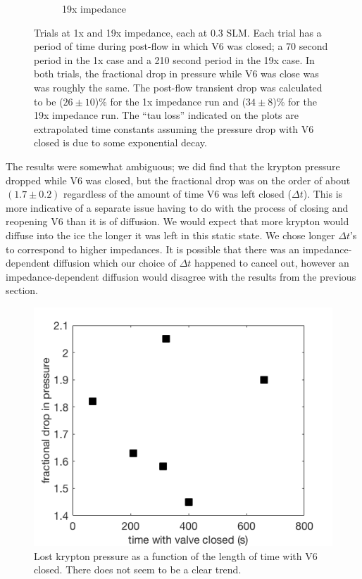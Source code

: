 \documentclass[12pt]{article}
\begin{document}
\begin{figure}[h!]
\begin{subfigure}{0.5\textwidth}
  \caption{19x impedance}
  \label{fig:cyrano15x}
\end{subfigure}
\caption{Trials at 1x and 19x impedance, each at 0.3 SLM. Each trial has a period of time during post-flow in which V6 was closed; a 70 second period in the 1x case and a 210 second period in the 19x case. In both trials, the fractional drop in pressure while V6 was close was was roughly the same. The post-flow transient drop was calculated to be ($26\pm10$)\% for the 1x impedance run and ($34\pm8$)\% for the 19x impedance run. The ``tau loss'' indicated on the plots are extrapolated time constants assuming the pressure drop with V6 closed is due to some exponential decay.} 
\label{fig:cyrano_trace}
\end{figure}

The results were somewhat ambiguous; we did find that the krypton pressure dropped while V6 was closed, but the fractional drop was on the order of about $(1.7\pm0.2)$ regardless of the amount of time V6 was left closed ($\Delta t$). This is more indicative of a separate issue having to do with the process of closing and reopening V6 than it is of diffusion. We would expect that more krypton would diffuse into the ice the longer it was left in this static state. We chose longer $\Delta t$'s to correspond to higher impedances. It is possible that there was an impedance-dependent diffusion which our choice of $\Delta t$ happened to cancel out, however an impedance-dependent diffusion would disagree with the results from the previous section.
\begin{figure}[h!]
\centering
\includegraphics[width=\textwidth]{Figures/diffusion_pdrop.png}
\caption{Lost krypton pressure as a function of the length of time with V6 closed. There does not seem to be a clear trend. }
\label{fig:closed_drop}
\end{figure}
\end{document}
